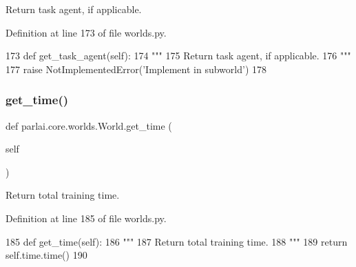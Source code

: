\begin{DoxyVerb}Return task agent, if applicable.
\end{DoxyVerb}
 

Definition at line 173 of file worlds.\+py.


\begin{DoxyCode}
173     \textcolor{keyword}{def }get\_task\_agent(self):
174         \textcolor{stringliteral}{"""}
175 \textcolor{stringliteral}{        Return task agent, if applicable.}
176 \textcolor{stringliteral}{        """}
177         \textcolor{keywordflow}{raise} NotImplementedError(\textcolor{stringliteral}{'Implement in subworld'})
178 
\end{DoxyCode}
\mbox{\label{classparlai_1_1core_1_1worlds_1_1World_a621ed405ee96d67bc4bab781145a3daa}} 
\subsubsection{\texorpdfstring{get\+\_\+time()}{get\_time()}}
{\footnotesize\ttfamily def parlai.\+core.\+worlds.\+World.\+get\+\_\+time (\begin{DoxyParamCaption}\item[{}]{self }\end{DoxyParamCaption})}

\begin{DoxyVerb}Return total training time.
\end{DoxyVerb}
 

Definition at line 185 of file worlds.\+py.


\begin{DoxyCode}
185     \textcolor{keyword}{def }get\_time(self):
186         \textcolor{stringliteral}{"""}
187 \textcolor{stringliteral}{        Return total training time.}
188 \textcolor{stringliteral}{        """}
189         \textcolor{keywordflow}{return} self.time.time()
190 
\end{DoxyCode}
\mbox{\label{classparlai_1_1core_1_1worlds_1_1World_acf90b0f1a9ec1314b905159559b4d4ab}} 

